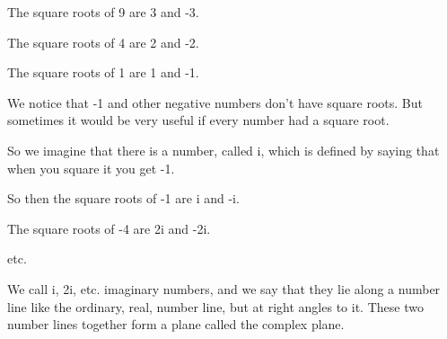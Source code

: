 The square roots of 9 are 3 and -3.
\par
The square roots of 4 are 2 and -2.
\par
The square roots of 1 are 1 and -1.
\par
We notice that -1 and other negative numbers don't have square roots.
But sometimes it would be very useful if every number had a square root.
\par
So we imagine that there is a number, called i, which is defined by saying
that when you square it you get -1.
\par
So then the square roots of -1 are i and -i.
\par
The square roots of -4 are 2i and -2i.
\par
etc. \par
We call i, 2i, etc. imaginary numbers, and we say that they lie along a number
line like the ordinary, real, number line, but at right angles to it.
These two number lines together form a plane called the complex plane.